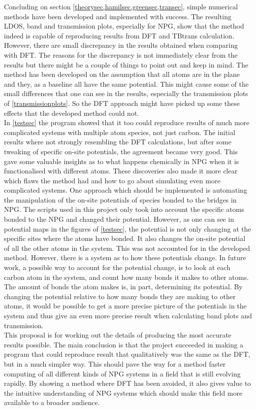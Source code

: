 Concluding on section \cref{theorysec,hamilsec,greensec,transec}, simple numerical methods have been developed and implemented with success. The resulting LDOS, band and transmission plots, especially for NPG, show that the method indeed is capable of reproducing results from DFT and TBtrans calculation. However, there are small discrepancy in the results obtained when comparing with DFT. The reasons for the discrepancy is not immediately clear from the results but there might be a couple of things to point out and keep in mind. The method has been developed on the assumption that all atoms are in the plane and they, as a baseline all have the same potential. This might cause some of the small differences that one can see in the results, especially the transmission plots of \cref{transmissionplots}. So the DFT approach might have picked up some these effects that the developed method could not.\\
In \cref{testsec} the program showed that it too could reproduce results of much more complicated systems with multiple atom species, not just carbon. The initial results where not strongly resembling the DFT calculations, but after some tweaking of specific on-site potentials, the agreement became very good. This gave some valuable insights as to what happens chemically in NPG when it is functionalised with different atoms. These discoveries also made it more clear which flaws the method had and how to go about simulating even more complicated systems. One approach which should be implemented is automating the manipulation of the on-site potentials of species bonded to the bridges in NPG. The scripts used in this project only took into account the specific atoms bonded to the NPG and changed their potential. However, as one can see in potential maps in the figures of \cref{testsec}, the potential is not only changing at the specific sites where the atoms have bonded. It also changes the on-site potential of all the other atoms in the system. This was not accounted for in the developed method. However, there is a system as to how these potentials change. In future work, a possible way to account for the potential change, is to look at each carbon atom in the system, and count how many bonds it makes to other atoms. The amount of bonds the atom makes is, in part, determining its potential. By changing the potential relative to how many bonds they are making to other atoms, it would be possible to get a more precise picture of the potentials in the system and thus give an even more precise result when calculating band plots and transmission. \\
This proposal is for working out the details of producing the most accurate results possible. The main conclusion is that the project succeeded in making a program that could reproduce result that qualitatively was the same as the DFT, but in a much simpler way. This should pave the way for a method faster computing of all different kinds of NPG systems in a field that is still evolving rapidly. By showing a method where DFT has been avoided, it also gives value to the intuitive understanding of NPG systems which should make this field more available to a broader audience.
